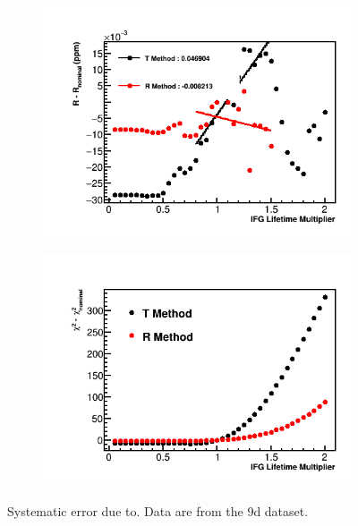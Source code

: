 \begin{figure}[h]
\centering
    \begin{subfigure}[t]{0.45\textwidth}
        \centering
        \includegraphics[width=\textwidth]{IFG_Lifetime_Compare_R_9d}
        \caption{}
    \end{subfigure}%
    \hspace{1cm}
    \begin{subfigure}[t]{0.45\textwidth}
        \centering
        \includegraphics[width=\textwidth]{IFG_Lifetime_Compare_Chisq_9d}
        \caption{}
    \end{subfigure}
\caption[Systematic error due to]{Systematic error due to. Data are from the 9d dataset.}
\label{fig:IFGAmpscan}
\end{figure}


